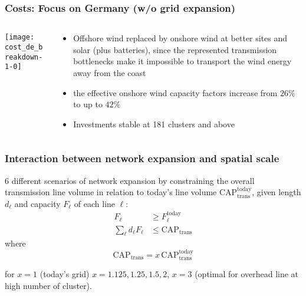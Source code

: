 \documentclass[10pt,aspectratio=169,dvipsnames]{beamer}
\let\olditem\item
\renewcommand{\item}{%
\olditem\vspace{5pt}}
\begin{document}
\begin{frame}
  \frametitle{Costs: Focus on Germany (w/o grid expansion)}

\begin{columns}[T]
\begin{column}{8.5cm}
\centering
  \texttt{[image: cost\_de\_breakdown-1-0]}
\end{column}
\begin{column}{6cm}
  \begin{itemize}
  \item Offshore wind replaced by onshore wind at better sites and solar (plus batteries), since
  the represented transmission bottlenecks make it impossible to
  transport the wind energy away from the coast
  \item the effective onshore wind capacity factors increase from $26\%$ to up to $42\%$
  \item Investments stable at 181 clusters and above
  \end{itemize}
\end{column}
\end{columns}


\end{frame}




\begin{frame}
  \frametitle{Interaction between network expansion and spatial scale}

  6 different scenarios of network expansion by constraining the
  overall transmission line volume in relation to today's line volume $\mathrm{CAP}_{\mathrm{trans}}^{\mathrm{today}}$, given length $d_\ell$ and capacity
  $F_\ell$ of each line $\ell$:
  \begin{align}
    F_\ell & \geq F_\ell^{\mathrm{today}} \\
    \sum_\ell d_\ell F_\ell & \leq \mathrm{CAP}_{\mathrm{trans}}
  \end{align}
  where
  \begin{equation}
    \mathrm{CAP}_{\mathrm{trans}} = x \, \mathrm{CAP}_{\mathrm{trans}}^{\mathrm{today}}
  \end{equation}

  for $x = 1$ (today's grid) $x = 1.125,1.25,1.5,2$, $x=3$ (optimal for overhead line at high number of cluster).
\end{frame}
\end{document}

